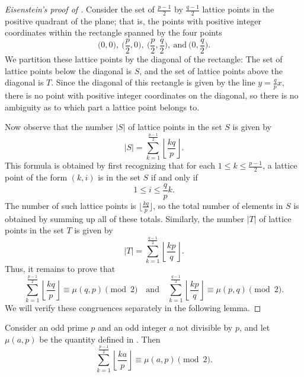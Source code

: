 \begin{proof}[Eisenstein's proof of ]
  Consider the set of $\frac{p-1}{2}$ by $\frac{q-1}{2}$ lattice points in the positive quadrant of the plane; that is, the points with positive integer coordinates within the rectangle spanned by the four points
  \begin{equation*}
    {\textstyle \bigl(0,0\bigr),~\bigl(\frac{p}{2},0\bigr),~\bigl(\frac{p}{2},\frac{q}{2}\bigr),~\text{and}~\bigl(0,\frac{q}{2}\bigr)}.
  \end{equation*}
  We partition these lattice points by the diagonal of the rectangle: The set of lattice points below the diagonal is $S$, and the set of lattice points above the diagonal is $T$. Since the diagonal of this rectangle is given by the line $y=\frac{q}{p}x$, there is no point with positive integer coordinates on the diagonal, so there is no ambiguity as to which part a lattice point belongs to.

  Now observe that the number $|S|$ of lattice points in the set $S$ is given by
  \begin{equation*}
    |S|= \sum_{k=1}^{\frac{p-1}{2}}\left\lfloor\frac{kq}{p}\right\rfloor.
  \end{equation*}
  This formula is obtained by first recognizing that for each $1\leq k\leq\frac{p-1}{2}$, a lattice point of the form $(k,i)$ is in the set $S$ if and only if
  \begin{equation*}
    1\leq i \leq \frac{q}{p}k.
  \end{equation*}
  The number of such lattice points is $\bigl\lfloor\frac{kq}{p}\bigr\rfloor$, so the total number of elements in $S$ is obtained by summing up all of these totals. Similarly, the number $|T|$ of lattice points in the set $T$ is given by
  \begin{equation*}
    |T|= \sum_{k=1}^{\frac{q-1}{2}}\left\lfloor\frac{kp}{q}\right\rfloor.
  \end{equation*}
  Thus, it remains to prove that
  \begin{equation*}
    \sum_{k=1}^{\frac{p-1}{2}}\left\lfloor\frac{kq}{p}\right\rfloor\equiv \mu(q,p)\pmod{2}\quad\text{and}\quad \sum_{k=1}^{\frac{q-1}{2}}\left\lfloor\frac{kp}{q}\right\rfloor\equiv\mu(p,q)\pmod{2}.
  \end{equation*}
  We will verify these congruences separately in the following lemma.
\end{proof}

\begin{lemma}
  Consider an odd prime $p$ and an odd integer $a$ not divisible by $p$, and let $\mu(a,p)$ be the quantity defined in . Then
  \begin{equation*}
    \sum_{k=1}^{\frac{p-1}{2}}\left\lfloor\frac{ka}{p}\right\rfloor \equiv \mu(a,p)\pmod{2}.
  \end{equation*}
\end{lemma}

